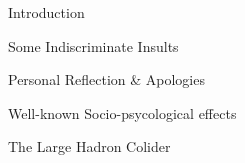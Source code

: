 \item Introduction
\item Some Indiscriminate Insults
\item Personal Reflection \& Apologies
\item Well-known Socio-psycological effects
\item The Large Hadron Colider
